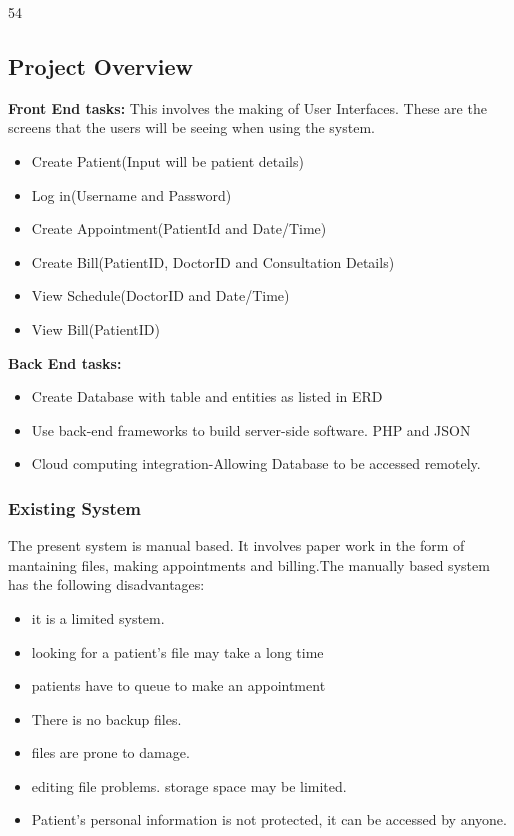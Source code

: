 \documentclass[11 pt]{article}
\begin{document}
54\subsection{Project Overview}
\textbf{Front End tasks:}
    This involves the making of User Interfaces. These are the screens that the users will be seeing when using the system.
    \begin{itemize}
    \item
    Create Patient(Input will be patient details)
    \item
    Log in(Username and Password)
    \item
    Create Appointment(PatientId and Date/Time)
    \item
    Create Bill(PatientID, DoctorID and Consultation Details)
    \item
    View Schedule(DoctorID and Date/Time)
    \item
    View Bill(PatientID)
    \end{itemize}
    \textbf{Back End tasks:}
    \begin{itemize}
    \item
    Create Database with table and entities as listed in ERD
    \item
    Use back-end frameworks to build server-side software. PHP and JSON    
    \item
    Cloud computing integration-Allowing Database to be accessed remotely.
    \end{itemize}

\subsubsection{Existing System}
The present system is manual based. It involves paper work in the form of mantaining files, making appointments and billing.The manually based system has the following disadvantages:
\begin{itemize}
\item
it is a limited system.
\item
looking for a patient's file may take a long time
\item
patients have to queue to make an appointment
\item
There is no backup files.
\item
files are prone to damage.
\item
editing file problems.
storage space may be limited.
\item
Patient's personal information is not protected, it can be accessed by anyone.
\end{itemize}
\end{document}
